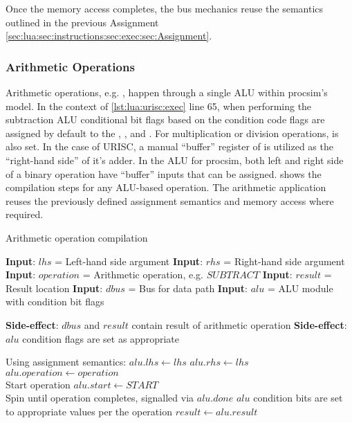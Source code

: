 \noindent Once the memory access completes, the bus mechanics reuse the semantics outlined in the previous Assignment \cref{sec:lua:sec:instructions:sec:exec:sec:Assignment}.
    
\subsubsection*{Arithmetic Operations}

Arithmetic operations, e.g. , happen through a single ALU within procsim's model. In the context of \cref{lst:lua:urisc:exec} line 65, when performing the subtraction ALU conditional bit flags based on the \hcmodel{} condition code flags are assigned by default to the , , and . For multiplication or division operations,  is also set. In the case of URISC, a manual ``buffer'' register of  is utilized as the ``right-hand side'' of it's adder. In the ALU for procsim, both left and right side of a binary operation have ``buffer'' inputs that can be assigned.  shows the compilation steps for any ALU-based operation. The arithmetic application reuses the previously defined assignment semantics and memory access where required.

\begin{algorithm}[h!]
    \caption{Arithmetic operation compilation}
    \label{alg:lua:arithmetic}
    \begin{algorithmic}[1]
        \Statex \textbf{Input}: $lhs$ = Left-hand side argument
        \Statex \textbf{Input}: $rhs$ = Right-hand side argument
        \Statex \textbf{Input}: $operation$ = Arithmetic operation, e.g. $SUBTRACT$
        \Statex \textbf{Input}: $result$ = Result location
        \Statex \textbf{Input}: $dbus$ = Bus for data path
        \Statex \textbf{Input}: $alu$ = ALU module with condition bit flags
        
        \Statex \textbf{Side-effect}: $dbus$ and $result$ contain result of arithmetic operation
        \Statex \textbf{Side-effect}: $alu$ condition flags are set as appropriate
        \Statex%
        
        \Statex Using assignment semantics:
        \State $alu.lhs \gets lhs$
        \State $alu.rhs \gets lhs$
        \State $alu.operation \gets operation$
        \\
        \Statex Start operation
        \State $alu.start \gets START$
        \\
        \State Spin until operation completes, signalled via $alu.done$
        \State $alu$ condition bits are set to appropriate values per the operation
        \State $result \gets alu.result$
    \end{algorithmic}
\end{algorithm}

